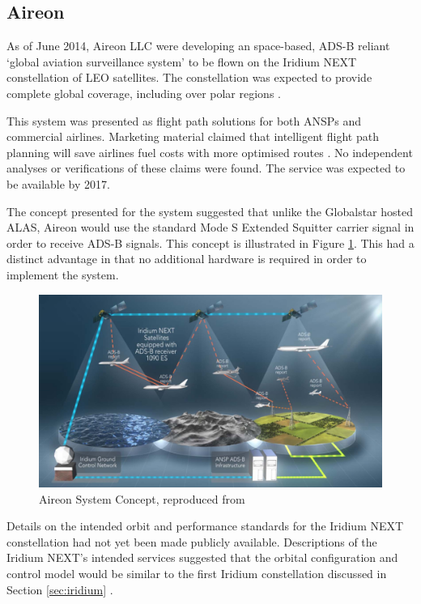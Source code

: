 \subsection{Aireon} \label{sec:aireon}
As of June 2014, Aireon LLC were developing an space-based, ADS-B reliant `global aviation surveillance system' \cite{ADS-B:Aireon_brochure} to be flown on the Iridium NEXT constellation of LEO satellites. The constellation was expected to provide complete global coverage, including over polar regions \cite{ADS-B:Aireon_comparison}.   

This system was presented as flight path solutions for both ANSPs and commercial airlines. Marketing material claimed that intelligent flight path planning will save airlines fuel costs with more optimised routes \cite{ADS-B:Aireon_comparison}. No independent analyses or verifications of these claims were found. The service was expected to be available by 2017.

The concept presented for the system suggested that unlike the Globalstar hosted ALAS, Aireon would use the standard Mode S Extended Squitter carrier signal in order to receive ADS-B signals\cite{Dawson2013}. This concept is illustrated in Figure \ref{fig:aireon_concept}. This had a distinct advantage in that no additional hardware is required in order to implement the system. 

\begin{figure}[htbp]
	\centering
	\includegraphics[scale = 0.55]{Pictures/aireon_concept.png}
	
	\caption[Aireon System Concept]{Aireon System Concept, reproduced from \cite{Dawson2013}}
	\label{fig:aireon_concept}
	\end{figure}

Details on the intended orbit and performance standards for the Iridium NEXT constellation had not yet been made publicly available. Descriptions of the Iridium NEXT's intended services suggested that the orbital configuration and control model would be similar to the first Iridium constellation discussed in Section \ref{sec:iridium}  \cite{ADS-B:Aireon_brochure}. 

